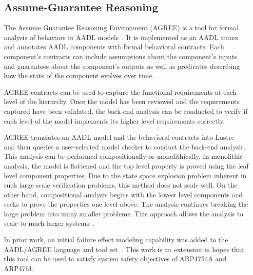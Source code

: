\subsection{Assume-Guarantee Reasoning}
\label{subsec:agree}
The Assume Guarantee Reasoning Environment (AGREE) is a tool for formal analysis of behaviors in AADL models~\cite{NFM2012:CoGaMiWhLaLu}.  It is implemented as an AADL annex and annotates AADL components with formal behavioral contracts. Each component's contracts can include assumptions about the component's inputs and guarantees about the component's outputs as well as predicates describing how the state of the component evolves over time.

AGREE contracts can be used to capture the functional requirements at each level of the hierarchy. Once the model has been reviewed and the requirements captured have been validated, the back-end analysis can be conducted to verify if each level of the model implements its higher level requirements correctly.

AGREE translates an AADL model and the behavioral contracts into Lustre~\cite{Halbwachs91:IEEE} and then queries a user-selected
model checker to conduct the back-end analysis. This analysis can be performed compositionally or monolithically. In monolithic analysis, the model is flattened and the top level property is proved using the leaf level component properties. Due to the state space explosion problem inherent in such large scale verification problems, this method does not scale well. On the other hand, compositional analysis begins with the lowest level components and seeks to prove the properties one level above. The analysis continues breaking the large problem into many smaller problems. This approach allows the analysis to scale to much larger systems~\cite{QFCS15:backes, NFM2012:CoGaMiWhLaLu}.

In prior work, an initial failure effect modeling capability was added to the AADL/AGREE language and tool set~\cite{Stewart17:IMBSA}. This work is an extension in hopes that this tool can be used to satisfy system safety objectives of ARP4754A and ARP4761.  




